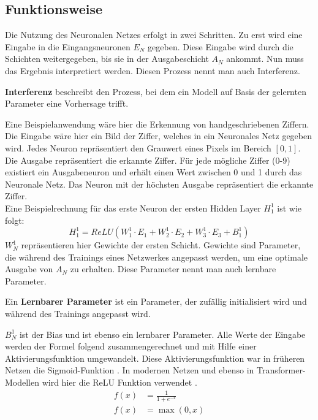 \subsection{Funktionsweise}
Die Nutzung des Neuronalen Netzes erfolgt in zwei Schritten.
Zu erst wird eine Eingabe in die Eingangsneuronen $E_N$ gegeben.
Diese Eingabe wird durch die Schichten weitergegeben, bis sie in der Ausgabeschicht $A_N$ ankommt.
Nun muss das Ergebnis interpretiert werden. Diesen Prozess nennt man auch Interferenz.\\
\begin{definition}\label{def:interferenz}
    \textbf{Interferenz} beschreibt den Prozess, bei dem ein Modell auf Basis der gelernten Parameter eine Vorhersage trifft.
\end{definition}

Eine Beispielanwendung wäre hier die Erkennung von handgeschriebenen Ziffern.
Die Eingabe wäre hier ein Bild der Ziffer, welches in ein Neuronales Netz gegeben wird.
Jedes Neuron repräsentiert den Grauwert eines Pixels im Bereich $[0,1]$.
Die Ausgabe repräsentiert die erkannte Ziffer.
Für jede mögliche Ziffer (0-9) existiert ein Ausgabeneuron und erhält einen Wert zwischen 0 und 1 durch das Neuronale Netz.
Das Neuron mit der höchsten Ausgabe repräsentiert die erkannte Ziffer.\\

Eine Beispielrechnung für das erste Neuron der ersten Hidden Layer $H^1_1$ ist wie folgt:
\begin{equation}
    H^1_1=ReLU(W^1_1\cdot E_1 + W^1_2\cdot E_2 + W^1_3\cdot E_3 + B^1_1)
\end{equation}
$W^1_N$ repräsentieren hier Gewichte der ersten Schicht.
Gewichte sind Parameter, die während des Trainings eines Netzwerkes angepasst werden, um eine optimale Ausgabe von $A_N$ zu erhalten.
Diese Parameter nennt man auch lernbare Parameter.\\

\begin{definition}\label{def:lernbare-parameter}
    Ein \textbf{Lernbarer Parameter} ist ein Parameter, der zufällig initialisiert wird und während des Trainings angepasst wird.
\end{definition}

$B^1_N$ ist der Bias und ist ebenso ein lernbarer Parameter.
Alle Werte der Eingabe werden der Formel folgend zusammengerechnet und mit Hilfe einer Aktivierungsfunktion umgewandelt.
Diese Aktivierungsfunktion war in früheren Netzen die Sigmoid-Funktion .
In modernen Netzen und ebenso in Transformer-Modellen wird hier die ReLU Funktion verwendet .
\begin{align}
    f(x) &= \frac{1}{1+e^{-x}}\label{eq:sigmoid}\\
    f(x) &= \max(0,x) \label{eq:relu}
\end{align}

